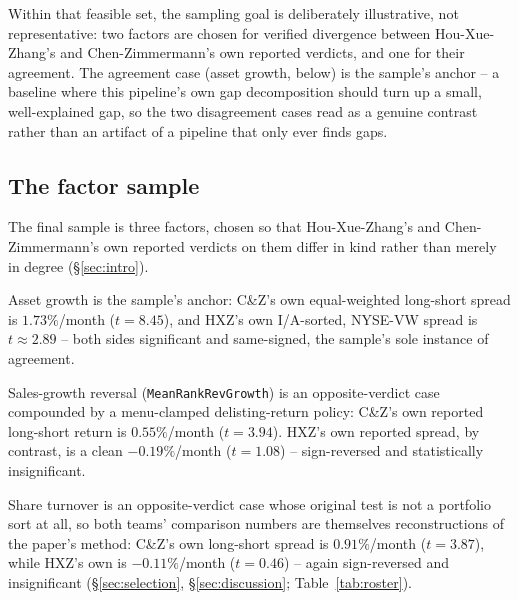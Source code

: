 Within that feasible set, the sampling goal is deliberately illustrative,
not representative: two factors are chosen for verified divergence between
Hou-Xue-Zhang's and Chen-Zimmermann's own reported verdicts, and one for
their agreement. The agreement case (asset growth, below) is the sample's
anchor -- a baseline where this pipeline's own gap decomposition should
turn up a small, well-explained gap, so the two disagreement cases read as
a genuine contrast rather than an artifact of a pipeline that only ever
finds gaps.

\subsection{The factor sample}

The final sample is three factors, chosen so that Hou-Xue-Zhang's and
Chen-Zimmermann's own reported verdicts on them differ in kind rather than
merely in degree (\S\ref{sec:intro}).

Asset growth \citep{CooperGulenSchill2008} is the sample's anchor: C\&Z's
own equal-weighted long-short spread is $1.73\%$/month ($t=8.45$), and
HXZ's own I/A-sorted, NYSE-VW spread is $t\approx 2.89$ -- both sides
significant and same-signed, the sample's sole instance of agreement.

Sales-growth reversal \citep{LakonishokShleiferVishny1994}
(\texttt{MeanRankRevGrowth}) is an opposite-verdict case compounded by a
menu-clamped delisting-return policy: C\&Z's own reported long-short return
is $0.55\%$/month ($t=3.94$). HXZ's own reported spread, by contrast, is a
clean $-0.19\%$/month
($t=1.08$) -- sign-reversed and statistically insignificant.

Share turnover \citep{DatarNaikRadcliffe1998} is an opposite-verdict case
whose original test is not a portfolio sort at all, so both teams'
comparison numbers are themselves reconstructions of the paper's method:
C\&Z's own long-short spread is $0.91\%$/month ($t=3.87$), while HXZ's own is
$-0.11\%$/month ($t=0.46$) -- again sign-reversed and insignificant
(\S\ref{sec:selection}, \S\ref{sec:discussion}; Table~\ref{tab:roster}).

